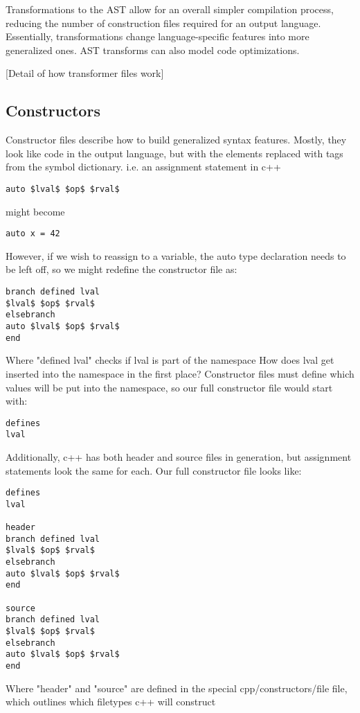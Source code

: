 \documentclass{article}
\begin{document}
Transformations to the AST allow for an overall simpler compilation process, reducing the number of construction files required for an output language. Essentially, transformations change language-specific features into more generalized ones. AST transforms can also model code optimizations.

[Detail of how transformer files work]

\subsection{Constructors}

Constructor files describe how to build generalized syntax features. Mostly, they look like code in the output language, but with the elements replaced with tags from the symbol dictionary.
i.e. an assignment statement in c++
\lstset{language=c++}
\begin{lstlisting}
auto $lval$ $op$ $rval$
\end{lstlisting}
might become
\lstset{language=c++}
\begin{lstlisting}
auto x = 42
\end{lstlisting}
However, if we wish to reassign to a variable, the auto type declaration needs to be left off, so we might redefine the constructor file as:
\begin{verbatim}
branch defined lval 
$lval$ $op$ $rval$
elsebranch
auto $lval$ $op$ $rval$
end
\end{verbatim}
Where "defined lval" checks if lval is part of the namespace
How does lval get inserted into the namespace in the first place?
Constructor files must define which values will be put into the namespace, so our full constructor file would start with:
\begin{verbatim}
defines
lval
\end{verbatim}
Additionally, c++ has both header and source files in generation, but assignment statements look the same for each.
Our full constructor file looks like:

\begin{verbatim}
defines
lval

header
branch defined lval 
$lval$ $op$ $rval$
elsebranch
auto $lval$ $op$ $rval$
end

source
branch defined lval 
$lval$ $op$ $rval$
elsebranch
auto $lval$ $op$ $rval$
end
\end{verbatim}

Where "header" and "source" are defined in the special cpp/constructors/file file, which outlines which filetypes c++ will construct
\end{document}
